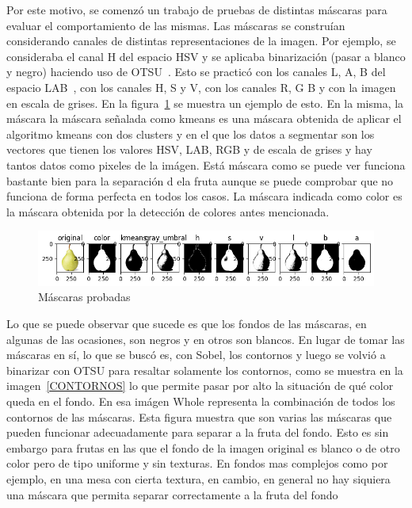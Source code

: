 \documentclass[a4paper, 12pt]{article}
\begin{document}
Por este motivo, se comenzó un trabajo de pruebas de distintas máscaras para evaluar el comportamiento de las mismas. Las máscaras se construían considerando canales de distintas representaciones de la imagen. Por ejemplo, se consideraba el canal H del espacio HSV y se aplicaba binarización (pasar a blanco y negro) haciendo uso de OTSU~\cite{otsu}. Esto se practicó con los canales L, A, B del espacio LAB~\cite{lab}, con los canales H, S y V, con los canales R, G B y con la imagen en escala de grises. En la figura~\ref{MASCARAS} se muestra un ejemplo de esto. En la misma, la máscara la máscara señalada como kmeans es una máscara obtenida de aplicar el algoritmo kmeans con dos clusters y en el que los datos a segmentar son los vectores que tienen los valores HSV, LAB, RGB y de escala de grises y hay tantos datos como pixeles de la imágen. Está máscara como se puede ver funciona bastante bien para la separación d ela fruta aunque se puede comprobar que no funciona de forma perfecta en todos los casos. La máscara indicada como color es la máscara obtenida por la detección de colores antes mencionada.

\begin{figure}[!htbp]
    \centering
    \includegraphics[width=\linewidth]{MASCARAS.png}
    \caption{Máscaras probadas}
    \label{MASCARAS}
\end{figure}

Lo que se puede observar que sucede es que los fondos de las máscaras, en algunas de las ocasiones, son negros y en otros son blancos. En lugar de tomar las máscaras en sí, lo que se buscó es, con Sobel, los contornos y luego se volvió a binarizar con OTSU para resaltar solamente los contornos, como se muestra en la imagen~\ref{CONTORNOS} lo que permite pasar por alto la situación de qué color queda en el fondo. En esa imágen Whole representa la combinación de todos los contornos de las máscaras. Esta figura muestra que son varias las máscaras que pueden funcionar adecuadamente para separar a la fruta del fondo. Esto es sin embargo para frutas en las que el fondo de la imagen original es blanco o de otro color pero de tipo uniforme y sin texturas. En fondos mas complejos como por ejemplo, en una mesa con cierta textura, en cambio, en general no hay siquiera una máscara que permita separar correctamente a la fruta del fondo
\end{document}
